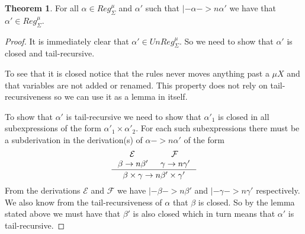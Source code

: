 \documentclass[a4paper, oneside]{memoir}
\theoremstyle{definition}
\newtheorem{theorem}{Theorem}
\begin{document}
\begin{theorem}
  For all $\alpha \in Reg_{\Sigma}^{\mu}$ and $\alpha'$ such that $|- \alpha ->n
  \alpha'$ we have that $\alpha' \in Reg_{\Sigma}^{\mu}$.

  \begin{proof}
    It is immediately clear that $\alpha' \in UnReg_{\Sigma}^{\mu}$. So we need
    to show that $\alpha'$ is closed and tail-recursive.

    To see that it is closed notice that the rules never moves anything past a
    $\mu X$ and that variables are not added or renamed. This property does not
    rely on tail-recursiveness so we can use it as a lemma in itself.

    To show that $\alpha'$ is tail-recursive we need to show that $\alpha'_1$ is
    closed in all subexpressions of the form $\alpha'_1 \times \alpha'_2$.
    For each such subexpressions there must be a subderivation in the derivation(s)
    of $\alpha ->n \alpha'$ of the form
    \[
    \inference{\mathcal{E} & \mathcal{F} \\ \beta ->n \beta' & \gamma ->n
      \gamma'}{\beta \times \gamma ->n \beta' \times \gamma'}
    \]
    From the derivations $\mathcal{E}$ and $\mathcal{F}$ we have $|- \beta ->n
    \beta'$ and $|- \gamma ->n \gamma'$ respectively. We also know from the
    tail-recursiveness of $\alpha$ that $\beta$ is closed. So by the lemma
    stated above we must have that $\beta'$ is also closed which in turn means
    that $\alpha'$ is tail-recursive.
  \end{proof}
\end{theorem}
\end{document}

